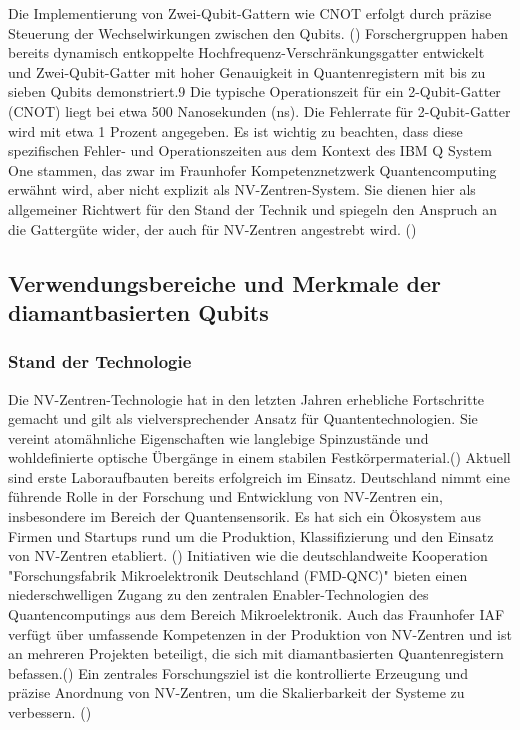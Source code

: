 Die Implementierung von Zwei-Qubit-Gattern wie CNOT erfolgt durch präzise Steuerung der Wechselwirkungen zwischen den Qubits. (\cite{gmbhCCGFachartikelQuantencomputer2025}) Forschergruppen haben bereits dynamisch entkoppelte Hochfrequenz-Verschränkungsgatter entwickelt und Zwei-Qubit-Gatter mit hoher Genauigkeit in Quantenregistern mit bis zu sieben Qubits demonstriert.9 Die typische Operationszeit für ein 2-Qubit-Gatter (CNOT) liegt bei etwa 500 Nanosekunden (ns). Die Fehlerrate für 2-Qubit-Gatter wird mit etwa 1 Prozent angegeben. Es ist wichtig zu beachten, dass diese spezifischen Fehler- und Operationszeiten aus dem Kontext des IBM Q System One stammen, das zwar im Fraunhofer Kompetenznetzwerk Quantencomputing erwähnt wird, aber nicht explizit als NV-Zentren-System. Sie dienen hier als allgemeiner Richtwert für den Stand der Technik und spiegeln den Anspruch an die Gattergüte wider, der auch für NV-Zentren angestrebt wird. (\cite{gmbhCCGFachartikelQuantencomputer2025})
\subsection{Verwendungsbereiche und Merkmale der diamantbasierten Qubits}
\subsubsection{Stand der Technologie}
Die NV-Zentren-Technologie hat in den letzten Jahren erhebliche Fortschritte gemacht und gilt als vielversprechender Ansatz für Quantentechnologien. Sie vereint atomähnliche Eigenschaften wie langlebige Spinzustände und wohldefinierte optische Übergänge in einem stabilen Festkörpermaterial.(\cite{childressDiamondNVCenters2013})
Aktuell sind erste Laboraufbauten bereits erfolgreich im Einsatz. Deutschland nimmt eine führende Rolle in der Forschung und Entwicklung von NV-Zentren ein, insbesondere im Bereich der Quantensensorik. Es hat sich ein Ökosystem aus Firmen und Startups rund um die Produktion, Klassifizierung und den Einsatz von NV-Zentren etabliert. (\cite{NVZentrenStickstoffFehlstellenDLR}) Initiativen wie die deutschlandweite Kooperation "Forschungsfabrik Mikroelektronik Deutschland (FMD-QNC)" bieten einen niederschwelligen Zugang zu den zentralen Enabler-Technologien des Quantencomputings aus dem Bereich Mikroelektronik. Auch das Fraunhofer IAF verfügt über umfassende Kompetenzen in der Produktion von NV-Zentren und ist an mehreren Projekten beteiligt, die sich mit diamantbasierten Quantenregistern befassen.(\cite{UngeahnteMoglichkeitenDurch}) Ein zentrales Forschungsziel ist die kontrollierte Erzeugung und präzise Anordnung von NV-Zentren, um die Skalierbarkeit der Systeme zu verbessern. (\cite{NVZentrenStickstoffFehlstellenDLR})
